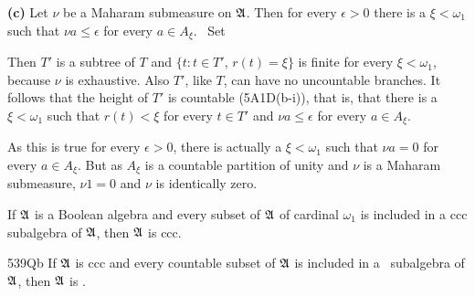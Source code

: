 {\medskip

{\bf (c)} Let $\nu$ be a Maharam submeasure on $\frak A$.   Then for every
$\epsilon>0$ there is a $\xi<\omega_1$ such that $\nu a\le\epsilon$ for
every $a\in A_{\xi}$.   \Prf\ Set


\noindent Then $T'$ is a subtree of $T$ and $\{t:t\in T'$, $r(t)=\xi\}$ is
finite for every $\xi<\omega_1$, because $\nu$ is exhaustive.   Also $T'$,
like $T$, can have no uncountable branches.   It follows that the height of
$T'$ is countable (5A1D(b-i)),
that is, that there is a $\xi<\omega_1$ such
that $r(t)<\xi$ for every $t\in T'$ and $\nu a\le\epsilon$ for every
$a\in A_{\xi}$.\ \Qed

As this is true for every $\epsilon>0$, there is actually a $\xi<\omega_1$
such that $\nu a=0$ for every $a\in A_{\xi}$.   But as $A_{\xi}$ is a
countable partition of unity and $\nu$ is a Maharam submeasure, $\nu 1=0$
and $\nu$ is identically zero.
}%

 If $\frak A$ is a Boolean algebra and every subset of
$\frak A$ of
cardinal $\omega_1$ is included in a ccc subalgebra of $\frak A$, then
$\frak A$ is ccc.   

\spheader 539Qb If $\frak A$ is ccc and every countable subset of
$\frak A$ is included
in a \wsid\ subalgebra of $\frak A$, then $\frak A$ is \wsid.

